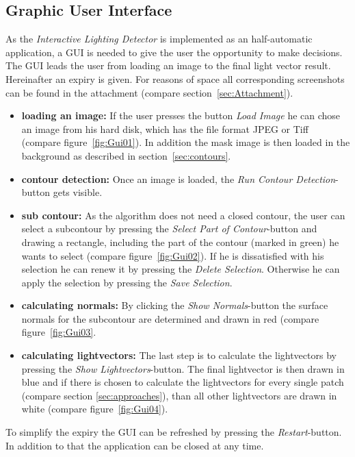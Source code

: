 \subsection{Graphic User Interface} \label{sec:GUI}
As the \textit{Interactive Lighting Detector} is implemented as an half-automatic application, a GUI is needed to give the user the opportunity to make decisions. The GUI leads the user from loading an image to the final light vector result. Hereinafter an expiry is given. For reasons of space all corresponding screenshots can be found in the attachment (compare section~\ref{sec:Attachment}).  
\begin{itemize}
\item \textbf{loading an image:} If the user presses the button \textit{Load Image} he can chose an image from his hard disk, which has the file format JPEG or Tiff (compare figure~\ref{fig:Gui01}). In addition the mask image is then loaded in the background as described in section~\ref{sec:contours}.
\item \textbf{contour detection:} Once an image is loaded, the \textit{Run Contour Detection}-button gets visible. 
\item \textbf{sub contour:} As the algorithm does not need a closed contour, the user can select a subcontour by pressing the \textit{Select Part of Contour}-button and drawing a rectangle, including the part of the contour (marked in green) he wants to select (compare figure~\ref{fig:Gui02}). If he is dissatisfied with his selection he can renew it by pressing the \textit{Delete Selection}. Otherwise he can apply the selection by pressing the \textit{Save Selection}. 
\item \textbf{calculating normals:} By clicking the \textit{Show Normals}-button the surface normals for the subcontour are determined and drawn in red (compare figure~\ref{fig:Gui03}.
\item \textbf{calculating lightvectors:} The last step is to calculate the lightvectors by pressing the \textit{Show Lightvectors}-button. The final lightvector is then drawn in blue and if there is chosen to calculate the lightvectors for every single patch (compare section \ref{sec:approaches}), than all other lightvectors are drawn in white (compare figure~\ref{fig:Gui04}). 
\end{itemize}

To simplify the expiry the GUI can be refreshed by pressing the \textit{Restart}-button. In addition to that the application can be closed at any time. 


\newpage